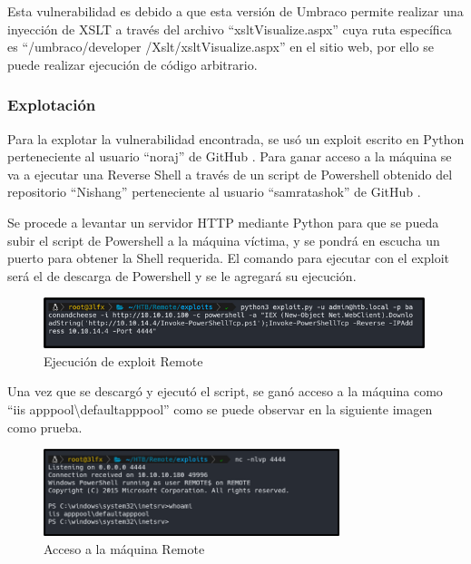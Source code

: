 Esta vulnerabilidad es debido a que esta versión de Umbraco permite realizar una inyección de XSLT a través del archivo “xsltVisualize.aspx” cuya ruta específica es “/umbraco/developer /Xslt/xsltVisualize.aspx” en el sitio web, por ello se puede realizar ejecución de código arbitrario.
\clearpage
\subsubsection{Explotación}
Para la explotar la vulnerabilidad encontrada, se usó un exploit escrito en Python perteneciente al usuario “noraj” de GitHub \cite{umbraco}. Para ganar acceso a la máquina se va a ejecutar una Reverse Shell a través de un script de Powershell obtenido del repositorio “Nishang” perteneciente al usuario “samratashok” de GitHub \cite{invokepower}.

Se procede a levantar un servidor HTTP mediante Python para que se pueda subir el script de Powershell a la máquina víctima,  y se pondrá en escucha un puerto para obtener la Shell requerida. El comando para ejecutar con el exploit será el de descarga de Powershell y se le agregará su ejecución.
\begin{figure}[H]
    \centering
    \includegraphics[width=0.99\textwidth]{imagenes/exprem.png}
    \caption{Ejecución de exploit Remote}
\end{figure}
Una vez que se descargó y ejecutó el script, se ganó acceso a la máquina como “iis apppool\textbackslash{}defaultapppool” como se puede observar en la siguiente imagen como prueba.
\begin{figure}[H]
    \centering
    \includegraphics[width=0.77\textwidth]{imagenes/acrem.png}
    \caption{Acceso a la máquina Remote}
\end{figure}
